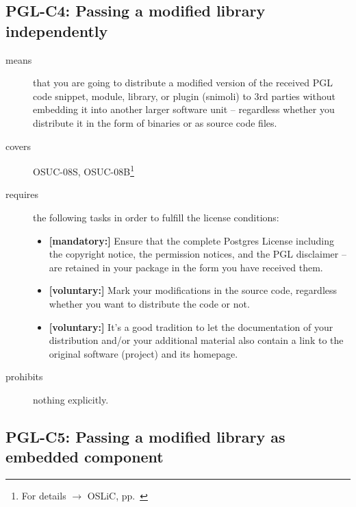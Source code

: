 \subsection{PGL-C4: Passing a modified library independently}
\label{OSUC-08S-PGL}\label{OSUC-08B-PGL}
\begin{description}

\item[means] that you are going to distribute a modified version of the received
PGL code snippet, module, library, or plugin (snimoli) to 3rd parties without
embedding it into another larger software unit -- regardless whether you
distribute it in the form of binaries or as source code files.

\item[covers] OSUC-08S, OSUC-08B\footnote{For details $\rightarrow$ OSLiC, pp.\
\pageref{OSUC-08B-DEF}}

\item[requires] the following tasks in order to fulfill the license conditions:
\begin{itemize}
  \item \textbf{[mandatory:]} Ensure that the complete Postgres License
  including the copyright notice, the permission notices, and the PGL disclaimer
  -- are retained in your package in the form you have received them.
  \item \textbf{[voluntary:]} Mark your modifications in the source code,
  regardless whether you want to distribute the code or not.
  \item \textbf{[voluntary:]} It's a good tradition to let the documentation of
  your distribution and/or your additional material also contain a link to the
  original software (project) and its homepage.
\end{itemize}

\item[prohibits] nothing explicitly.

\end{description}


\subsection{PGL-C5: Passing a modified library as embedded component}
\label{OSUC-10S-PGL} \label{OSUC-10B-PGL}

